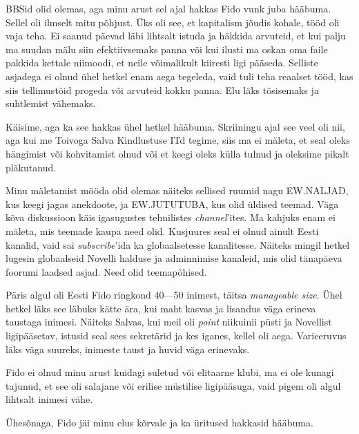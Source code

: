 BBSid olid olemas, aga minu arust sel ajal hakkas Fido vunk juba hääbuma. 
Sellel oli ilmselt mitu põhjust. Üks oli see, et kapitalism jõudis kohale, 
tööd oli vaja teha. Ei saanud päevad läbi lihtsalt istuda ja häkkida 
arvuteid, et kui palju ma suudan mälu siin efektiivsemaks panna 
või kui ilusti ma oskan oma faile pakkida kettale niimoodi, et neile
võimalikult kiiresti ligi pääseda. Selliste asjadega ei olnud ühel 
hetkel enam aega tegeleda, vaid tuli teha reaalset tööd, kas siis tellimustöid
progeda või arvuteid kokku panna. 
Elu läks tõsisemaks ja suhtlemist vähemaks. 


Käisime, aga ka see hakkas ühel hetkel hääbuma. Skriiningu ajal see veel oli nii, aga kui me 
Toivoga Salva Kindlustuse ITd tegime, siis ma ei 
mäleta, et seal oleks hängimist või kohvitamist olnud või et keegi 
oleks külla tulnud ja oleksime pikalt pläkutanud. 


Minu mäletamist mööda olid olemas näiteks sellised ruumid 
nagu EW.NALJAD, kus keegi jagas anekdoote, ja EW.JUTUTUBA, kus olid üldised teemad. Väga kõva 
diskussioon käis igasugustes tehnilistes 
\emph{channel}'ites. Ma kahjuks enam ei mäleta, mis teemade kaupa need olid. 
Kusjuures seal ei olnud ainult Eesti kanalid, vaid sai 
\emph{subscribe}'ida ka globaalsetesse kanalitesse. Näiteks mingil hetkel lugesin globaalseid Novelli halduse ja adminnimise kanaleid, mis olid tänapäeva foorumi laadsed asjad. Need olid 
teemapõhised. 

Päris algul oli Eesti Fido ringkond 40---50 inimest, täitsa 
\emph{manageable size}. Ühel hetkel läks see läbuks kätte ära, kui 
maht kasvas ja lisandus väga erineva taustaga inimesi. Näiteks Salvas, kui meil 
oli \emph{point} niikuinii püsti ja Novellist ligipääsetav, istusid seal sees sekretärid ja kes iganes, kellel oli aega. Varieeruvus läks väga 
suureks, inimeste taust ja huvid väga erinevaks. 


Fido ei olnud minu arust kuidagi suletud või elitaarne klubi, ma ei ole 
kunagi tajunud, et see oli salajane või 
erilise müstilise ligipääsuga, vaid pigem oli algul lihtsalt inimesi vähe. 

Ühesõnaga, Fido jäi minu elus kõrvale ja ka üritused hakkasid hääbuma.

